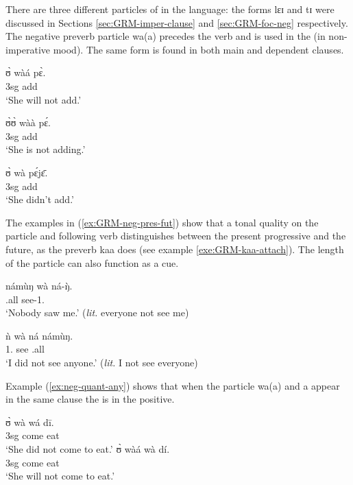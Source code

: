 \begin{exe}
\begin{exe}
\begin{exe}
\begin{exe}
\begin{exe}
\begin{exe}
\begin{exe}
\begin{exe}
\begin{exe}
\begin{exe}
\begin{exe}
\begin{exe}
There are three different particles of  in the language:  the forms {\sls lɛɪ} and {\sls tɪ}   were discussed in Sections \ref{sec:GRM-imper-clause} and  \ref{sec:GRM-foc-neg}  respectively.  The negative preverb particle {\sls wa(a)} precedes the verb and is used in the  (in non-imperative mood). The same form is found in both  main and dependent clauses. 


\ea\label{ex:GRM-neg-pres-fut}

\ea
\gll ʊ̀  wàá pɛ̀.\\
   {\sc 3sg}  {\neg} add\\
\glt  `She will not add.'

 \ex 
\gll  ʊ̀ʊ̀ wàà pɛ́.\\
  {\sc 3sg} {\neg} add\\
\glt  `She is not adding.'


 \ex 
\gll  ʊ̀ wà pɛ́jɛ̄.\\
  {\sc 3sg} {\neg} add\\
\glt  `She didn't  add.'

\z 
 \z

 The examples in (\ref{ex:GRM-neg-pres-fut}) show that a tonal quality on the  particle and following verb  distinguishes between the present progressive and  the future,  as the preverb {\sls kaa} does (see example \ref{exe:GRM-kaa-attach}). The length of the  particle can also function as a cue.

\ea\label{ex:neg-quant-any}
\ea\label{ex:neg-quant-any-1}
\gll námùŋ wà ná-ŋ̀.\\
 {\clf}.all {\neg} see-{1.\sg}\\
\glt  `Nobody saw me.' ({\it lit.} everyone not see me) 

\ex\label{ex:neg-quant-any-2}
\gll  ǹ wà ná námùŋ.\\
  {1.\sg}  {\neg}   see  {\clf}.all\\
\glt  `I did not see anyone.' ({\it lit.} I not see everyone) 

\z 
 \z

 Example (\ref{ex:neg-quant-any}) shows that when the  particle {\sls wa(a)} and a  appear in the same clause the  is  in the positive. 

\ea\label{ex:GRM-neg-come}
 
  
\ea
\gll ʊ̀ wà wá dī.\\
{\sc 3sg} {\neg} come eat\\
\glt `She did not come to eat.'
\ex
\gll ʊ̀ wàá wà dí.\\
{\sc 3sg} {\neg} come eat\\
\glt `She will not come to eat.'


\end{exe}
\end{exe}
\end{exe}
\end{exe}
\end{exe}
\end{exe}
\end{exe}
\end{exe}
\end{exe}
\end{exe}
\end{exe}
\end{exe}
